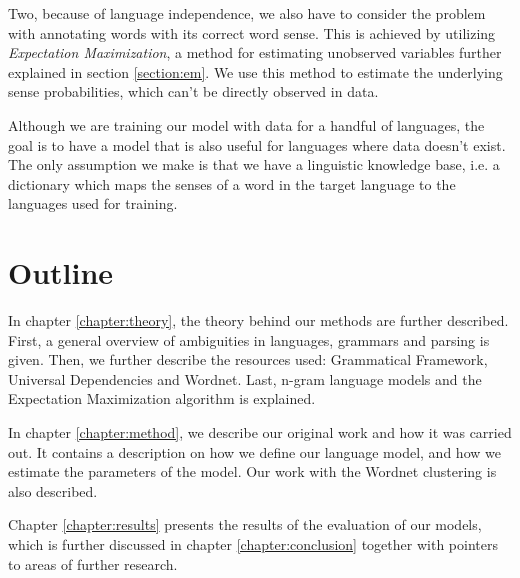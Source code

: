 Two, because of language independence, we also have to consider the problem with annotating words with its correct word sense. 
This is achieved by utilizing \emph{Expectation Maximization}, a method for estimating unobserved variables further explained in section \ref{section:em}. We use this method to estimate the underlying sense probabilities, which can't be directly observed in data.

Although we are training our model with data for a handful of languages, the goal is to have a model that is also useful for languages where data doesn't exist. The only assumption we make is that we have a linguistic knowledge base, i.e. a dictionary which maps the senses of a word in the target language to the languages used for training.

\section{Outline}
In chapter \ref{chapter:theory}, the theory behind our methods are further described. First, a general overview of ambiguities in languages, grammars and parsing is given. Then, we further describe the resources used: Grammatical Framework, Universal Dependencies and Wordnet. Last, n-gram language models and the Expectation Maximization algorithm is explained.

In chapter \ref{chapter:method}, we describe our original work and how it was carried out. It contains a description on how we define our language model, and how we estimate the parameters of the model. Our work with the Wordnet clustering is also described.

Chapter \ref{chapter:results} presents the results of the evaluation of our models, which is further discussed in chapter \ref{chapter:conclusion} together with pointers to areas of further research. 



